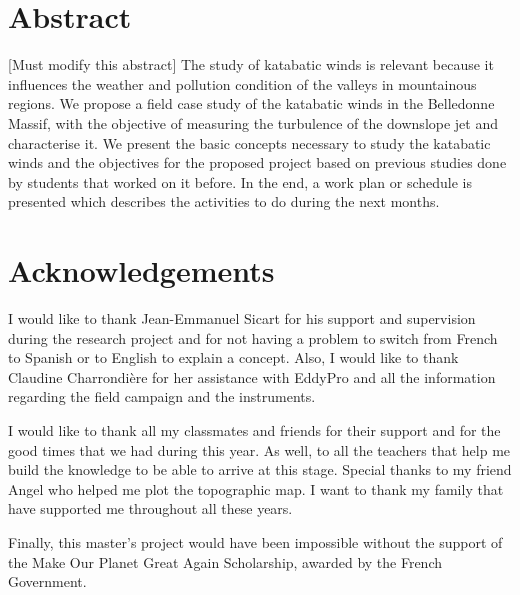 \documentclass[english, a4paper, 12pt, twoside]{report}
\begin{document}
\linespread{1.5}

\restoregeometry %

\thispagestyle{plain} %
\clearpage\mbox{}\clearpage %

\newpage
\linespread{1.25}
\section*{Abstract}
    [Must modify this abstract] The study of katabatic winds is relevant because it influences the weather and pollution condition of the valleys in mountainous regions. We propose a field case study of the katabatic winds in the Belledonne Massif, with the objective of measuring the turbulence of the downslope jet and characterise it. We present the basic concepts necessary to study the katabatic winds and the objectives for the proposed project based on previous studies done by students that worked on it before. In the end, a work plan or schedule is presented which describes the activities to do during the next months.

\newpage

\section*{Acknowledgements}

I would like to thank Jean-Emmanuel Sicart for his support and supervision during the research project and for not having a problem to switch from French to Spanish or to English to explain a concept. Also, I would like to thank Claudine Charrondi\`ere for her assistance with EddyPro and all the information regarding the field campaign and the instruments.

I would like to thank all my classmates and friends for their support and for the good times that we had during this year. As well, to all the teachers that help me build the knowledge to be able to arrive at this stage. Special thanks to my friend Angel who helped me plot the topographic map. I want to thank my family that have supported me throughout all these years.

Finally, this master's project would have been impossible without the support of the Make Our Planet Great Again Scholarship, awarded by the French Government.
\end{document}
